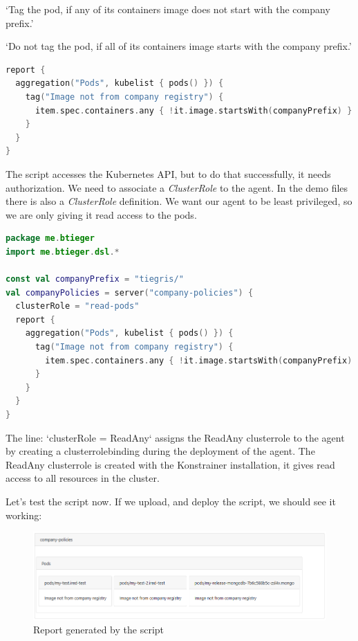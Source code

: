 `Tag the pod, if any of its containers image does not start with the company prefix.'

`Do not tag the pod, if all of its containers image starts with the company prefix.'

\begin{lstlisting}[caption={Tag pods},language=Kotlin,label=code:todo]
report {
  aggregation("Pods", kubelist { pods() }) {
    tag("Image not from company registry") {
      item.spec.containers.any { !it.image.startsWith(companyPrefix) }
    }
  }
}
\end{lstlisting}

The script accesses the Kubernetes API, but to do that successfully, it needs authorization. We need to associate a \emph{ClusterRole} to the agent. In the demo files there is also a \emph{ClusterRole} definition. We want our agent to be least privileged, so we are only giving it read access to the pods.

\begin{lstlisting}[caption={TODO},language=Kotlin,label=code:todo]
package me.btieger
import me.btieger.dsl.*

const val companyPrefix = "tiegris/"
val companyPolicies = server("company-policies") {
  clusterRole = "read-pods"
  report {
    aggregation("Pods", kubelist { pods() }) {
      tag("Image not from company registry") {
        item.spec.containers.any { !it.image.startsWith(companyPrefix) }
      }
    }
  }
}
\end{lstlisting}

The line: `clusterRole = ReadAny` assigns the ReadAny clusterrole to the agent by creating a clusterrolebinding during the deployment of the agent. The ReadAny clusterrole is created with the Konstrainer installation, it gives read access to all resources in the cluster.

Let's test the script now. If we upload, and deploy the script, we should see it working:

\begin{figure}[h]
  \centering
  \includegraphics[width=130mm, keepaspectratio]{content/60_caseStudy2/company_policies_1.png}
  \caption{Report generated by the script}
  \label{fig:report}
\end{figure}

